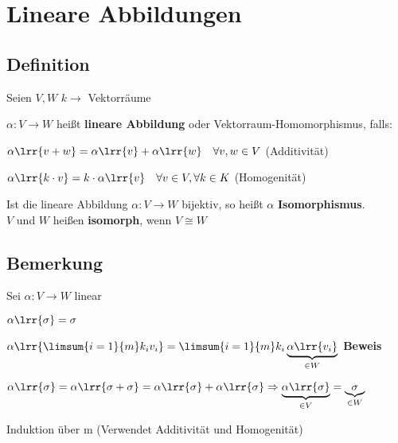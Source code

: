 \newpage
\section{Lineare Abbildungen}
	
\subsection{Definition}
	Seien $V,W$ $k\rightarrow$ Vektorräume
		\item $\alpha:V\rightarrow W$ heißt \textbf{lineare Abbildung} oder Vektorraum-Homomorphismus, falls:
				\item $\alpha\lrr{v+w}=\alpha\lrr{v}+\alpha\lrr{w}\quad\forall v,w\in V$ (Additivität)
				\item $\alpha\lrr{k\cdot v}=k\cdot\alpha\lrr{v}\quad\forall v\in V,\forall k\in K$ (Homogenität)
			\subExEnd
		\item Ist die lineare Abbildung $\alpha: V\rightarrow W$ bijektiv, so heißt $\alpha$ \textbf{Isomorphismus}.\\
			$V$ und $W$ heißen \textbf{isomorph}, wenn $V\cong W$
	\subExEnd
	
\subsection{Bemerkung}
	Sei $\alpha:V\rightarrow W$ linear
		\item $\alpha\lrr{\sigma}=\sigma$
		\item $\alpha\lrr{\limsum{i=1}{m}k_iv_i}=\limsum{i=1}{m}k_i\underbrace{\alpha\lrr{v_i}}_{\scriptstyle \in W}$
	\subExEnd
	\textbf{Beweis}
		\item $\alpha\lrr{\sigma}=\alpha\lrr{\sigma+\sigma}=\alpha\lrr{\sigma}+\alpha\lrr{\sigma}\Rightarrow\underbrace{\alpha\lrr{\sigma}}_{\scriptstyle \in V}=\underbrace{\sigma}_{\scriptstyle \in W}$
		\item Induktion über m (Verwendet Additivität und Homogenität)
	\subExEnd
	
